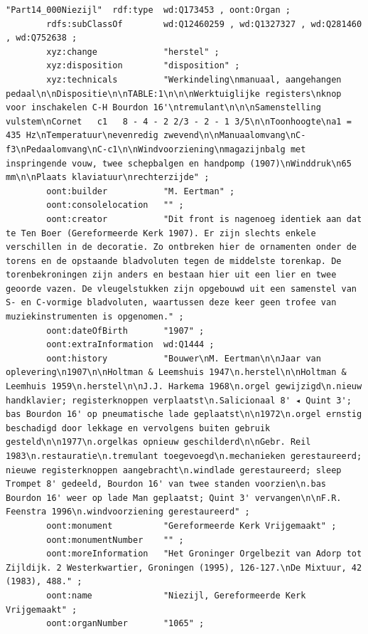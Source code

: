 \begin{lstlisting}[caption={Part14\_000Niezijl}]
"Part14_000Niezijl"  rdf:type  wd:Q173453 , oont:Organ ;
        rdfs:subClassOf        wd:Q12460259 , wd:Q1327327 , wd:Q281460 , wd:Q752638 ;
        xyz:change             "herstel" ;
        xyz:disposition        "disposition" ;
        xyz:technicals         "Werkindeling\nmanuaal, aangehangen pedaal\n\nDispositie\n\nTABLE:1\n\n\nWerktuiglijke registers\nknop voor inschakelen C-H Bourdon 16'\ntremulant\n\n\nSamenstelling vulstem\nCornet   c1   8 - 4 - 2 2/3 - 2 - 1 3/5\n\nToonhoogte\na1 = 435 Hz\nTemperatuur\nevenredig zwevend\n\nManuaalomvang\nC-f3\nPedaalomvang\nC-c1\n\nWindvoorziening\nmagazijnbalg met inspringende vouw, twee schepbalgen en handpomp (1907)\nWinddruk\n65 mm\n\nPlaats klaviatuur\nrechterzijde" ;
        oont:builder           "M. Eertman" ;
        oont:consolelocation   "" ;
        oont:creator           "Dit front is nagenoeg identiek aan dat te Ten Boer (Gereformeerde Kerk 1907). Er zijn slechts enkele verschillen in de decoratie. Zo ontbreken hier de ornamenten onder de torens en de opstaande bladvoluten tegen de middelste torenkap. De torenbekroningen zijn anders en bestaan hier uit een lier en twee geoorde vazen. De vleugelstukken zijn opgebouwd uit een samenstel van S- en C-vormige bladvoluten, waartussen deze keer geen trofee van muziekinstrumenten is opgenomen." ;
        oont:dateOfBirth       "1907" ;
        oont:extraInformation  wd:Q1444 ;
        oont:history           "Bouwer\nM. Eertman\n\nJaar van oplevering\n1907\n\nHoltman & Leemshuis 1947\n.herstel\n\nHoltman & Leemhuis 1959\n.herstel\n\nJ.J. Harkema 1968\n.orgel gewijzigd\n.nieuw handklavier; registerknoppen verplaatst\n.Salicionaal 8' ◂ Quint 3'; bas Bourdon 16' op pneumatische lade geplaatst\n\n1972\n.orgel ernstig beschadigd door lekkage en vervolgens buiten gebruik gesteld\n\n1977\n.orgelkas opnieuw geschilderd\n\nGebr. Reil 1983\n.restauratie\n.tremulant toegevoegd\n.mechanieken gerestaureerd; nieuwe registerknoppen aangebracht\n.windlade gerestaureerd; sleep Trompet 8' gedeeld, Bourdon 16' van twee standen voorzien\n.bas Bourdon 16' weer op lade Man geplaatst; Quint 3' vervangen\n\nF.R. Feenstra 1996\n.windvoorziening gerestaureerd" ;
        oont:monument          "Gereformeerde Kerk Vrijgemaakt" ;
        oont:monumentNumber    "" ;
        oont:moreInformation   "Het Groninger Orgelbezit van Adorp tot Zijldijk. 2 Westerkwartier, Groningen (1995), 126-127.\nDe Mixtuur, 42 (1983), 488." ;
        oont:name              "Niezijl, Gereformeerde Kerk Vrijgemaakt" ;
        oont:organNumber       "1065" ;

\end{lstlisting}
